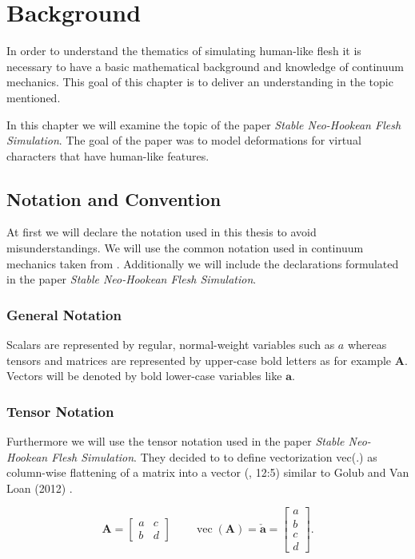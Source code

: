 \chapter{Background} \label{c:Background}
In order to understand the thematics of simulating human-like flesh it is necessary to have a basic mathematical background and knowledge of continuum mechanics. This goal of this chapter is to deliver an understanding in the topic mentioned.

In this chapter we will examine the topic of the paper \textit{Stable Neo-Hookean Flesh Simulation}. The goal of the paper was to model deformations for virtual characters that have human-like features.


\section{Notation and Convention}
At first we will declare the notation used in this thesis to avoid misunderstandings. We will use the common notation used in continuum mechanics taken from \cite{Spencer1980}. Additionally we will include the declarations formulated in the paper \textit{Stable Neo-Hookean Flesh Simulation}. 

\subsection{General Notation}
Scalars are represented by regular, normal-weight variables such as $a$ whereas 
tensors and matrices are represented by upper-case bold letters as for example $\textbf{A}$. Vectors will be denoted by bold lower-case variables like $\textbf{a}$. 


\subsection{Tensor Notation}
Furthermore we will use the tensor notation used in the paper \textit{Stable Neo-Hookean Flesh Simulation}. They decided to to define vectorization vec(.) as column-wise flattening of a matrix into a vector (\cite{Smith:2018:SNF:3191713.3180491}, 12:5) similar to Golub and Van Loan (2012) \cite{golub2012matrix}.

\[
\textbf{A} = \begin{bmatrix} a & c \\ b & d \end{bmatrix} \qquad \operatorname{vec}(\textbf{A}) = \boldsymbol{\check{a}} = \begin{bmatrix} a \\ b \\ c \\ d \end{bmatrix}.
\]

